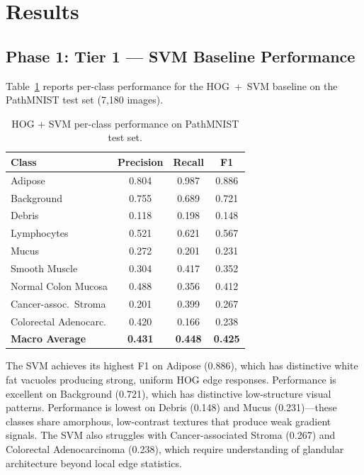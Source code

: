 \documentclass{article}
\begin{document}
\section{Results}
\label{sec:results}

\subsection{Phase 1: Tier 1 --- SVM Baseline Performance}

Table~\ref{tab:svm_results} reports per-class performance for the HOG~+~SVM baseline on the PathMNIST test set (7,180 images).

\begin{table}[h]
\centering
\caption{HOG + SVM per-class performance on PathMNIST test set.}
\label{tab:svm_results}
\begin{tabular}{lccc}
\toprule
Class & Precision & Recall & F1 \\
\midrule
Adipose               & 0.804 & 0.987 & 0.886 \\
Background            & 0.755 & 0.689 & 0.721 \\
Debris                & 0.118 & 0.198 & 0.148 \\
Lymphocytes           & 0.521 & 0.621 & 0.567 \\
Mucus                 & 0.272 & 0.201 & 0.231 \\
Smooth Muscle         & 0.304 & 0.417 & 0.352 \\
Normal Colon Mucosa   & 0.488 & 0.356 & 0.412 \\
Cancer-assoc.\ Stroma & 0.201 & 0.399 & 0.267 \\
Colorectal Adenocarc. & 0.420 & 0.166 & 0.238 \\
\midrule
\textbf{Macro Average} & \textbf{0.431} & \textbf{0.448} & \textbf{0.425} \\
\bottomrule
\end{tabular}
\end{table}

The SVM achieves its highest F1 on Adipose (0.886), which has distinctive white fat vacuoles producing strong, uniform HOG edge responses. Performance is excellent on Background (0.721), which has distinctive low-structure visual patterns. Performance is lowest on Debris (0.148) and Mucus (0.231)---these classes share amorphous, low-contrast textures that produce weak gradient signals. The SVM also struggles with Cancer-associated Stroma (0.267) and Colorectal Adenocarcinoma (0.238), which require understanding of glandular architecture beyond local edge statistics.
\end{document}
